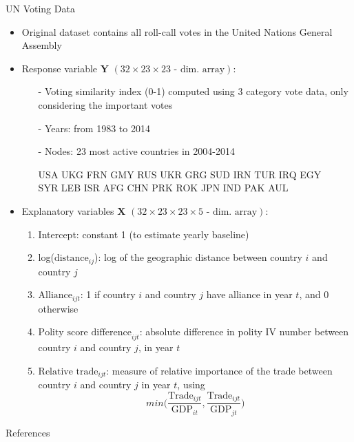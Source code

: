 \documentclass[serif,mathserif,final,table]{beamer}
\begin{document}
\begin{frame}{}
\begin{columns}[t]
\begin{column}{0.235\linewidth}
\begin{block}{UN Voting Data}
 	  	\begin{itemize}
 	  		\item Original dataset \cite{12379_2016} contains all roll-call votes in the United Nations General Assembly\\
 	  		\item Response variable $\boldsymbol{Y}$  \small{$(32 \times 23 \times 23 \mbox{ - dim. array})$}:
 	  		\begin{enumerate}
 	  		\item [-] Voting similarity index (0-1)
computed using 3 category vote data, only considering the important votes
\item [-] Years: from 1983 to 2014
\item [-] Nodes: 23 most active countries in 2004-2014
\begin{tabbing}
	\footnotesize
USA UKG FRN GMY RUS UKR GRG SUD IRN TUR IRQ EGY \\
	\footnotesize{SYR LEB ISR AFG CHN PRK ROK JPN IND PAK AUL}
\end{tabbing}
 	  		\end{enumerate}
 	  		\item Explanatory variables $\boldsymbol{X}$  \small{$(32 \times 23 \times 23 \times 5 \mbox{ - dim. array})$}:
 	  		\begin{enumerate}
             	\item Intercept: constant 1 (to estimate yearly baseline)
 	  			\item log($\mbox{distance}_{ij}$): log of the geographic distance between country $i$ and country $j$
 	  			\item $\mbox{Alliance}_{ijt}$: 1 if country $i$ and country $j$ have alliance in year $t$, and 0 otherwise
 	  			\item $\mbox{Polity score difference}_{ijt}$: absolute difference in polity IV number between country $i$ and country $j$, in year $t$
 	  			\item $\mbox{Relative trade}_{ijt}$: measure of relative importance of the trade between country $i$ and country $j$ in year $t$, using $$min\Big(\frac{\mbox{Trade}_{ijt}}{\mbox{GDP}_{it}}, \frac{\mbox{Trade}_{ijt}}{\mbox{GDP}_{jt}}\Big)$$
 	  		\end{enumerate}
 	  	\end{itemize}
 	            \end{block} 	
 	         
                	\begin{block}{References}
		{\tiny  }
	\end{block}
    \end{column}
    

\end{columns}
\end{frame}
\end{document}
